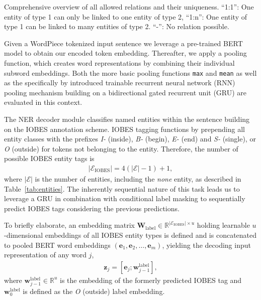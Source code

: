 \documentclass[conference, table]{IEEEtran}
\newcommand{\RR} {\mathbb R}
\newcommand{\1} {\mathbbm{1}}
\newcommand{\mat}{\bm}
\begin{document}
\begin{table}[t]
%
 \caption{Comprehensive overview of all allowed relations and their uniqueness. ``1:1'': One entity of type 1 can only be linked to one entity of type 2, ``1:n'': One entity of type 1 can be linked to many entities of type 2. ``-'': No relation possible.}
\label{tab:relations}
\end{table}

Given a WordPiece \cite{schuster2012japanese} tokenized input sentence we leverage a pre-trained BERT \cite{devlin2018bert} model to obtain our encoded token embedding. Thereafter, we apply a pooling function, which creates word representations by combining their individual subword embeddings. Both the more basic pooling functions \texttt{max} and \texttt{mean} as well as the specifically by \cite{kpi-bert} introduced  trainable recurrent neural network (RNN) pooling mechanism building on a bidirectional gated recurrent unit (GRU) \cite{cho2014properties} are evaluated in this context.

The NER decoder module classifies named entities within the sentence building on the IOBES annotation scheme. IOBES tagging functions by prepending all entity classes with the prefixes \textit{I-} (inside), \textit{B-} (begin), \textit{E-} (end) and \textit{S-} (single), or \textit{O} (outside) for tokens not belonging to the entity. Therefore, the number of possible IOBES entity tags is
\begin{align}\lvert \mathcal{E}_{\text{IOBES}} \rvert = 4 \left( \lvert \mathcal{E} \rvert - 1 \right) + 1, \end{align} 
where $\lvert \mathcal{E} \rvert$ is the number of entities, including the \textit{none} entity, as described in Table~\ref{tab:entities}. The inherently sequential nature of this task leads us to leverage a GRU in combination with conditional label masking to sequentially predict IOBES tags considering the previous predictions. 

To briefly elaborate, an embedding matrix $\mat{W}_{\text{label}} \in \RR^{\lvert \mathcal{E}_{\text{IOBES}} \rvert \times u}$ holding learnable $u$-dimensional embeddings of all IOBES entity types is defined and is concatenated to pooled BERT word embeddings $(\mat{e}_1, \mat{e}_2, \dots, \mat{e}_m)$, yielding the decoding input representation of any word $j$,
\begin{align}
    \mat{z}_j = \left[ \mat{e}_j; \mat{w}_{j-1}^\text{label}\right],
\end{align}
where $\mat{w}_{j-1}^\text{label} \in \RR^u$ is the embedding of the formerly predicted IOBES tag and $\mat{w}_0^\text{label}$ is defined as the \textit{O} (outside) label embedding.
\end{document}
